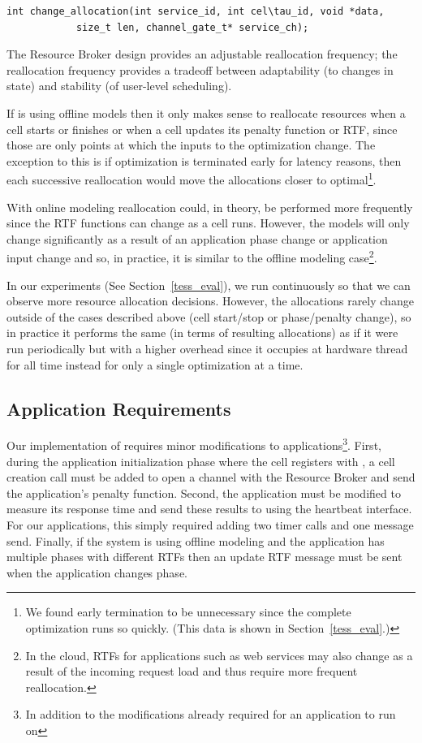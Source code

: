 \begin{lstlisting}
int change_allocation(int service_id, int cel\tau_id, void *data,
 			size_t len, channel_gate_t* service_ch);
\end{lstlisting}

The Resource Broker design provides an adjustable reallocation frequency; the reallocation frequency provides a tradeoff
between adaptability (to changes in state) and stability (of user-level
scheduling).  

If \pacora is using offline models then it only makes sense to reallocate resources when a cell starts or finishes or when a cell updates its penalty function or RTF, since those are only points at which the inputs to the optimization change.  The exception to this is if optimization is terminated early for latency reasons, then each successive reallocation would move the allocations closer to optimal\footnote{We found early termination to be unnecessary since the complete optimization runs so quickly.  (This data is shown in Section~\ref{tess_eval}.)}. 

With online modeling reallocation could, in theory, be performed more frequently since the RTF functions can change as a cell runs.  However, the models will only change significantly as a result of an application phase change or application input change and so, in practice, it is similar to the offline modeling case\footnote{In the cloud, RTFs for applications such as web services may also change as a result of the incoming request load and thus require more frequent reallocation.}.

In our experiments (See Section~\ref{tess_eval}), we run \pacora continuously so that we can observe more resource allocation decisions. However, the allocations rarely change outside of the cases described above (\ie cell start/stop or phase/penalty change), so in practice it performs the same (in terms of resulting allocations) as if it were run periodically but with a higher overhead since it occupies at hardware thread for all time instead for only a single optimization at a time. 

\subsection{Application Requirements}
Our \tess implementation of \pacora requires minor modifications to applications\footnote{In addition to the modifications already required for an application to run on \tess}.  First, during the application initialization phase where the cell registers with \tess, a cell creation call must be added to open a channel with the Resource Broker and send the application's penalty function.  Second, the application must be modified to measure its response time and send these results to \pacora using the heartbeat interface.  For our applications, this simply required adding two timer calls and one message send.  Finally, if the system is using offline modeling and the application has multiple phases with different RTFs then an update RTF message must be sent when the application changes phase.  

